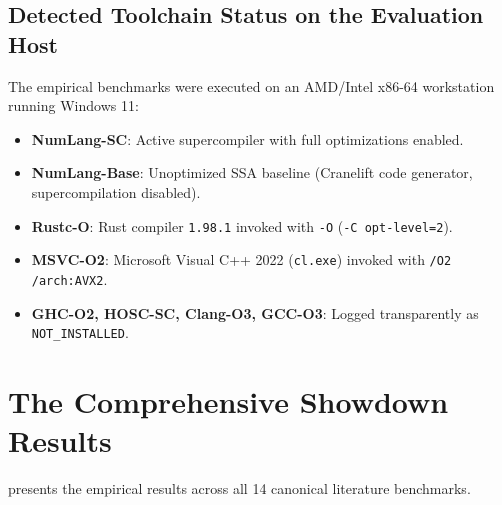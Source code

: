 \subsection{Detected Toolchain Status on the Evaluation Host}
The empirical benchmarks were executed on an AMD/Intel x86-64 workstation running Windows 11:
\begin{itemize}
    \item \textbf{NumLang-SC}: Active supercompiler with full optimizations enabled.
    \item \textbf{NumLang-Base}: Unoptimized SSA baseline (Cranelift code generator, supercompilation disabled).
    \item \textbf{Rustc-O}: Rust compiler \texttt{1.98.1} invoked with \texttt{-O} (\texttt{-C opt-level=2}).
    \item \textbf{MSVC-O2}: Microsoft Visual C++ 2022 (\texttt{cl.exe}) invoked with \texttt{/O2 /arch:AVX2}.
    \item \textbf{GHC-O2, HOSC-SC, Clang-O3, GCC-O3}: Logged transparently as \texttt{NOT\_INSTALLED}.
\end{itemize}

\section{The Comprehensive Showdown Results}
\label{sec:eval:results_table}

 presents the empirical results across all 14 canonical literature benchmarks.

